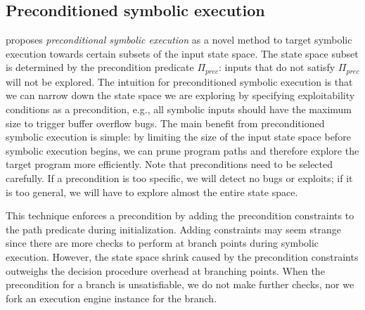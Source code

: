 


\subsection{Preconditioned symbolic execution}
\label{precontioned-symbolic-execution}

\cite{AEG-NDSS11} proposes {\em preconditional symbolic execution} as a novel method to target symbolic execution towards certain subsets of the input state space. The state space subset is determined by the precondition predicate $\Pi_{prec}$: inputs that do not satisfy $\Pi_{prec}$ will not be explored. The intuition for preconditioned symbolic execution is that we can narrow down the state space we are exploring by specifying exploitability conditions as a precondition, e.g., all symbolic inputs should have the maximum size to trigger buffer overflow bugs. The main benefit from preconditioned symbolic execution is simple: by limiting the size of the input state space before symbolic execution begins, we can prune program paths and therefore explore the target program more efficiently.
Note that preconditions need to be selected carefully. If a precondition is too specific, we will detect no bugs or exploits; if it is too general, we will have to explore almost the entire state space. %

This technique enforces a precondition by adding the precondition constraints to the path predicate during initialization. Adding constraints may seem strange since there are more checks to perform at branch points during symbolic execution. However, the state space shrink caused by the precondition constraints outweighs the decision procedure overhead at branching points. When the precondition for a branch is unsatisfiable, we do not make further checks, nor we fork an execution engine instance for the branch.%

